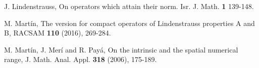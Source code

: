 \documentclass[12pt,a4paper]{amsart}
\theoremstyle{definition}
\numberwithin{equation}{section}
\begin{document}
\begin{thebibliography}{}
 J. Lindenstrauss, On operators which attain their norm. Isr. J. Math. {\bf 1} 139-148.

 M. Mart\'in, The version for compact operators of Lindenstrauss properties A and B, RACSAM {\bf 110} (2016), 269-284.

 M. Mart\'in, J. Mer\'i and R. Pay\'a, On the intrinsic and the spatial numerical range, J. Math. Anal. Appl. {\bf 318} (2006), 175-189.









\end{thebibliography}
\end{document}

